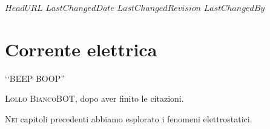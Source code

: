 \svnidlong
{$HeadURL$}
{$LastChangedDate$}
{$LastChangedRevision$}
{$LastChangedBy$}

\chapter{Corrente elettrica}

\begin{introduction}
	‘‘BEEP BOOP''
	\begin{flushright}
		\textsc{Lollo BiancoBOT}, dopo aver finito le citazioni. %
	\end{flushright}
\end{introduction} %
\lettrine[findent=1pt, nindent=0pt]{N}{ei} capitoli precedenti abbiamo esplorato i fenomeni elettrostatici. 
